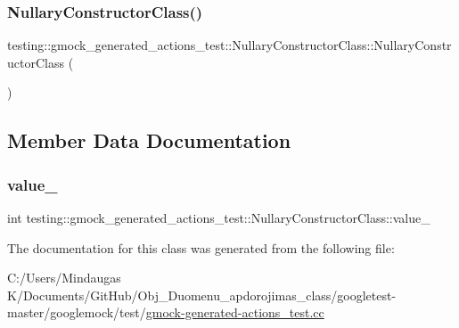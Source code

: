 \subsubsection{\texorpdfstring{NullaryConstructorClass()}{NullaryConstructorClass()}\hspace{0.1cm}{\footnotesize\ttfamily [3/3]}}
{\footnotesize\ttfamily testing\+::gmock\+\_\+generated\+\_\+actions\+\_\+test\+::\+Nullary\+Constructor\+Class\+::\+Nullary\+Constructor\+Class (\begin{DoxyParamCaption}{ }\end{DoxyParamCaption})\hspace{0.3cm}{\ttfamily [inline]}}



\subsection{Member Data Documentation}
\mbox{\label{classtesting_1_1gmock__generated__actions__test_1_1_nullary_constructor_class_aa877ccc5aff335cbf81b8de90abee732}} 
\subsubsection{\texorpdfstring{value\_}{value\_}}
{\footnotesize\ttfamily int testing\+::gmock\+\_\+generated\+\_\+actions\+\_\+test\+::\+Nullary\+Constructor\+Class\+::value\+\_\+}



The documentation for this class was generated from the following file\+:\begin{DoxyCompactItemize}
\item 
C\+:/\+Users/\+Mindaugas K/\+Documents/\+Git\+Hub/\+Obj\+\_\+\+Duomenu\+\_\+apdorojimas\+\_\+class/googletest-\/master/googlemock/test/\mbox{\hyperlink{googletest-master_2googlemock_2test_2gmock-generated-actions__test_8cc}{gmock-\/generated-\/actions\+\_\+test.\+cc}}\end{DoxyCompactItemize}
